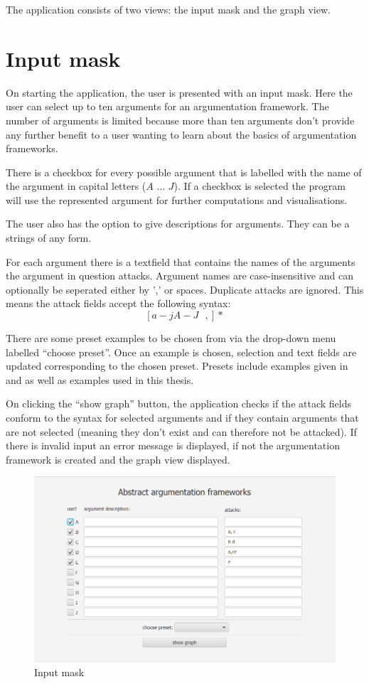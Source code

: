 \documentclass[draft,final]{vutinfth} %
\newcommand{\hl}{\par\vspace{6pt}} %
\begin{document}
The application consists of two views: the input mask and the graph view.

\section{Input mask}
On starting the application, the user is presented with an input mask. Here the user can select up to ten arguments for an argumentation framework. The number of arguments is limited because more than ten arguments don't provide any further benefit to a user wanting to learn about the basics of argumentation frameworks.\hl
There is a checkbox for every possible argument that is labelled with the name of the argument in capital letters ($A$ ... $J$). If a checkbox is selected the program will use the represented argument for further computations and visualisations.\hl
The user also has the option to give descriptions for arguments. They can be a strings of any form.\hl
For each argument there is a textfield that contains the names of the arguments the argument in question attacks. Argument names are case-insensitive and can optionally be seperated either by ',' or spaces. Duplicate attacks are ignored. This means the attack fields accept the following syntax: \[[a-jA-J\text{ },]*\]\hl

There are some preset examples to be chosen from via the drop-down menu labelled ``choose preset''. Once an example is chosen, selection and text fields are updated corresponding to the chosen preset. Presets include examples given in \cite{Dung} and \cite{Egly} as well as examples used in this thesis.\hl
On clicking the ``show graph'' button, the application checks if the attack fields conform to the syntax for selected arguments and if they contain arguments that are not selected (meaning they don't exist and can therefore not be attacked). If there is invalid input an error message is displayed, if not the argumentation framework is created and the graph view displayed.\hl

\FloatBarrier
	\begin{figure}[!ht]
		\centering
		\includegraphics[width=\linewidth]{pics/chaotic.png}
		\caption{Input mask}
	\end{figure}
\FloatBarrier
\end{document}
